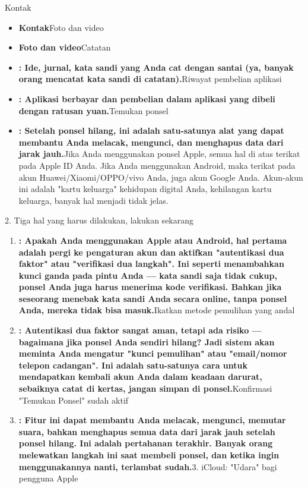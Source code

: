 


Kontak

\begin{itemize}
  \item \textbf{Kontak}Foto dan video
  \item \textbf{Foto dan video}Catatan
  \item \textbf{: Ide, jurnal, kata sandi yang Anda cat dengan santai (ya, banyak orang mencatat kata sandi di catatan).}Riwayat pembelian aplikasi
  \item \textbf{: Aplikasi berbayar dan pembelian dalam aplikasi yang dibeli dengan ratusan yuan.}Temukan ponsel
  \item \textbf{: Setelah ponsel hilang, ini adalah satu-satunya alat yang dapat membantu Anda melacak, mengunci, dan menghapus data dari jarak jauh.}Jika Anda menggunakan ponsel Apple, semua hal di atas terikat pada Apple ID Anda. Jika Anda menggunakan Android, maka terikat pada akun Huawei/Xiaomi/OPPO/vivo Anda, juga akun Google Anda. Akun-akun ini adalah "kartu keluarga" kehidupan digital Anda, kehilangan kartu keluarga, banyak hal menjadi tidak jelas.
\end{itemize}

2. Tiga hal yang harus dilakukan, lakukan sekarang


\begin{enumerate}
  \item \textbf{: Apakah Anda menggunakan Apple atau Android, hal pertama adalah pergi ke pengaturan akun dan aktifkan "autentikasi dua faktor" atau "verifikasi dua langkah". Ini seperti menambahkan kunci ganda pada pintu Anda — kata sandi saja tidak cukup, ponsel Anda juga harus menerima kode verifikasi. Bahkan jika seseorang menebak kata sandi Anda secara online, tanpa ponsel Anda, mereka tidak bisa masuk.}Ikatkan metode pemulihan yang andal
  \item \textbf{: Autentikasi dua faktor sangat aman, tetapi ada risiko — bagaimana jika ponsel Anda sendiri hilang? Jadi sistem akan meminta Anda mengatur "kunci pemulihan" atau "email/nomor telepon cadangan". Ini adalah satu-satunya cara untuk mendapatkan kembali akun Anda dalam keadaan darurat, sebaiknya catat di kertas, jangan simpan di ponsel.}Konfirmasi "Temukan Ponsel" sudah aktif
  \item \textbf{: Fitur ini dapat membantu Anda melacak, mengunci, memutar suara, bahkan menghapus semua data dari jarak jauh setelah ponsel hilang. Ini adalah pertahanan terakhir. Banyak orang melewatkan langkah ini saat membeli ponsel, dan ketika ingin menggunakannya nanti, terlambat sudah.}3. iCloud: "Udara" bagi pengguna Apple
\end{enumerate}

